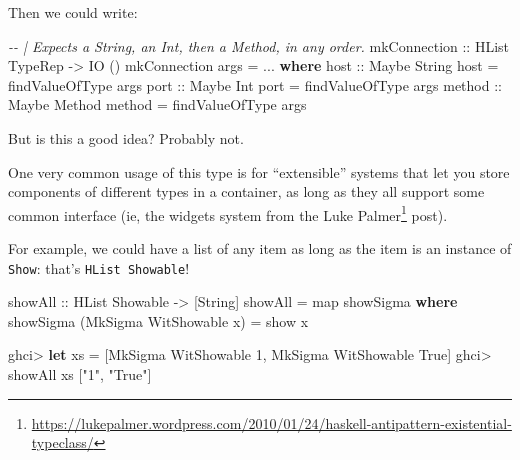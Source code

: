 \documentclass[]{article}
\newenvironment{Shaded}{}{}
\newcommand{\CommentTok}[1]{\textcolor[rgb]{0.38,0.63,0.69}{\textit{#1}}}
\newcommand{\DataTypeTok}[1]{\textcolor[rgb]{0.56,0.13,0.00}{#1}}
\newcommand{\DecValTok}[1]{\textcolor[rgb]{0.25,0.63,0.44}{#1}}
\newcommand{\FunctionTok}[1]{\textcolor[rgb]{0.02,0.16,0.49}{#1}}
\newcommand{\KeywordTok}[1]{\textcolor[rgb]{0.00,0.44,0.13}{\textbf{#1}}}
\newcommand{\NormalTok}[1]{#1}
\newcommand{\OperatorTok}[1]{\textcolor[rgb]{0.40,0.40,0.40}{#1}}
\newcommand{\OtherTok}[1]{\textcolor[rgb]{0.00,0.44,0.13}{#1}}
\newcommand{\StringTok}[1]{\textcolor[rgb]{0.25,0.44,0.63}{#1}}
\renewcommand{\href}[2]{#2\footnote{\url{#1}}}
\begin{document}
Then we could write:

\begin{Shaded}
\begin{Highlighting}[]
\CommentTok{{-}{-} | Expects a String, an Int, then a Method, in any order.}
\OtherTok{mkConnection ::} \DataTypeTok{HList} \DataTypeTok{TypeRep} \OtherTok{{-}\textgreater{}} \DataTypeTok{IO}\NormalTok{ ()}
\NormalTok{mkConnection args }\OtherTok{=} \OperatorTok{...}
  \KeywordTok{where}
\OtherTok{    host ::} \DataTypeTok{Maybe} \DataTypeTok{String}
\NormalTok{    host }\OtherTok{=}\NormalTok{ findValueOfType args}
\OtherTok{    port ::} \DataTypeTok{Maybe} \DataTypeTok{Int}
\NormalTok{    port }\OtherTok{=}\NormalTok{ findValueOfType args}
\OtherTok{    method ::} \DataTypeTok{Maybe} \DataTypeTok{Method}
\NormalTok{    method }\OtherTok{=}\NormalTok{ findValueOfType args}
\end{Highlighting}
\end{Shaded}

But is this a good idea? Probably not.

One very common usage of this type is for ``extensible'' systems that let you
store components of different types in a container, as long as they all support
some common interface (ie, the widgets system from the
\href{https://lukepalmer.wordpress.com/2010/01/24/haskell-antipattern-existential-typeclass/}{Luke
Palmer} post).

For example, we could have a list of any item as long as the item is an instance
of \texttt{Show}: that's \texttt{HList\ Showable}!

\begin{Shaded}
\begin{Highlighting}[]
\OtherTok{showAll ::} \DataTypeTok{HList} \DataTypeTok{Showable} \OtherTok{{-}\textgreater{}}\NormalTok{ [}\DataTypeTok{String}\NormalTok{]}
\NormalTok{showAll }\OtherTok{=} \FunctionTok{map}\NormalTok{ showSigma}
  \KeywordTok{where}
\NormalTok{    showSigma (}\DataTypeTok{MkSigma} \DataTypeTok{WitShowable}\NormalTok{ x) }\OtherTok{=} \FunctionTok{show}\NormalTok{ x}
\end{Highlighting}
\end{Shaded}

\begin{Shaded}
\begin{Highlighting}[]
\NormalTok{ghci}\OperatorTok{\textgreater{}} \KeywordTok{let}\NormalTok{ xs }\OtherTok{=}\NormalTok{ [}\DataTypeTok{MkSigma} \DataTypeTok{WitShowable} \DecValTok{1}\NormalTok{, }\DataTypeTok{MkSigma} \DataTypeTok{WitShowable} \DataTypeTok{True}\NormalTok{]}
\NormalTok{ghci}\OperatorTok{\textgreater{}}\NormalTok{ showAll xs}
\NormalTok{[}\StringTok{"1"}\NormalTok{, }\StringTok{"True"}\NormalTok{]}
\end{Highlighting}
\end{Shaded}
\end{document}
